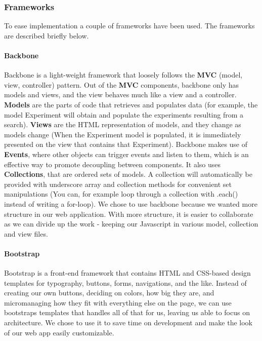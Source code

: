 

\subsubsection{Frameworks}
\label{sec:web_frame}
To ease implementation a couple of frameworks have been used. The frameworks are described briefly below.
\paragraph{Backbone}
Backbone\cite{web_1} is a light-weight framework that loosely follows the \textbf{MVC} (model, view, controller) pattern. Out of the \textbf{MVC} components, backbone only has models and views, and the view behaves much like a view and a controller. \textbf{Models} are the parts of code that retrieves and populates data (for example, the model Experiment will obtain and populate the experiments resulting from a search). \textbf{Views} are the HTML representation of models, and they change as models change (When the Experiment model is populated, it is immediately presented on the view that contains that Experiment).
Backbone makes use of \textbf{Events}, where other objects can trigger events and listen to them, which is an effective way to promote decoupling between components. It also uses \textbf{Collections}, that are ordered sets of models. A collection will automatically be provided with underscore array and collection methods for convenient set manipulations (You can, for example loop through a collection with .each() instead of writing a for-loop). We chose to use backbone because we wanted more structure in our web application. With more structure, it is easier to collaborate as we can divide up the work - keeping our Javascript in various model, collection and view files.

\paragraph{Bootstrap}
Bootstrap\cite{web_2} is a front-end framework that contains HTML and CSS-based design templates for typography, buttons, forms, navigations, and the like. Instead of creating our own buttons, deciding on colors, how big they are, and micromanaging how they fit with everything else on the page, we can use bootstraps templates that handles all of that for us, leaving us able to focus on architecture. We chose to use it to save time on development and make the look of our web app easily customizable.

